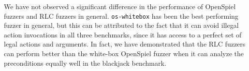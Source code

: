 We have not observed a significant difference in the performance of OpenSpiel fuzzers and RLC fuzzers in general.
\texttt{os-whitebox} has been the best performing fuzzer in general, but this can be attributed to the fact that it can avoid illegal action invocations in all three benchmarks, since it has access to a perfect set of legal actions and arguments.
In fact, we have demonstrated that the RLC fuzzers can perform better than the white-box OpenSpiel fuzzer when it can analyze the preconditions equally well in the blackjack benchmark.
